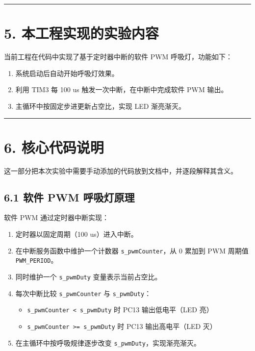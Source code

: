 \documentclass[
  chinese,
  UTF8,
  oneside,
  openany]{ctexbook}
\providecommand{\tightlist}{%
  \setlength{\itemsep}{0pt}\setlength{\parskip}{0pt}}
\begin{document}
\begin{center}\rule{0.5\linewidth}{0.5pt}\end{center}

\section{5.
本工程实现的实验内容}\label{ux672cux5de5ux7a0bux5b9eux73b0ux7684ux5b9eux9a8cux5185ux5bb9-1}

当前工程在代码中实现了基于定时器中断的软件 PWM 呼吸灯，功能如下：

\begin{enumerate}
\def\labelenumi{\arabic{enumi}.}
\tightlist
\item
  系统启动后自动开始呼吸灯效果。
\item
  利用 TIM3 每 100 us 触发一次中断，在中断中完成软件 PWM 输出。
\item
  主循环中按固定步进更新占空比，实现 LED 渐亮渐灭。
\end{enumerate}

\begin{center}\rule{0.5\linewidth}{0.5pt}\end{center}

\section{6. 核心代码说明}\label{ux6838ux5fc3ux4ee3ux7801ux8bf4ux660e-3}

这一部分把本次实验中需要手动添加的代码放到文档中，并逐段解释其含义。

\subsection{6.1 软件 PWM
呼吸灯原理}\label{ux8f6fux4ef6-pwm-ux547cux5438ux706fux539fux7406}

软件 PWM 通过定时器中断实现：

\begin{enumerate}
\def\labelenumi{\arabic{enumi}.}
\tightlist
\item
  定时器以固定周期（100 us）进入中断。
\item
  在中断服务函数中维护一个计数器 \texttt{s\_pwmCounter}，从 0 累加到 PWM
  周期值 \texttt{PWM\_PERIOD}。
\item
  同时维护一个 \texttt{s\_pwmDuty} 变量表示当前占空比。
\item
  每次中断比较 \texttt{s\_pwmCounter} 与 \texttt{s\_pwmDuty}：

  \begin{itemize}
  \tightlist
  \item
    \texttt{s\_pwmCounter\ \textless{}\ s\_pwmDuty} 时 PC13
    输出低电平（LED 亮）
  \item
    \texttt{s\_pwmCounter\ \textgreater{}=\ s\_pwmDuty} 时 PC13
    输出高电平（LED 灭）
  \end{itemize}
\item
  在主循环中按呼吸规律逐步改变 \texttt{s\_pwmDuty}，实现渐亮渐灭。
\end{enumerate}
\end{document}
